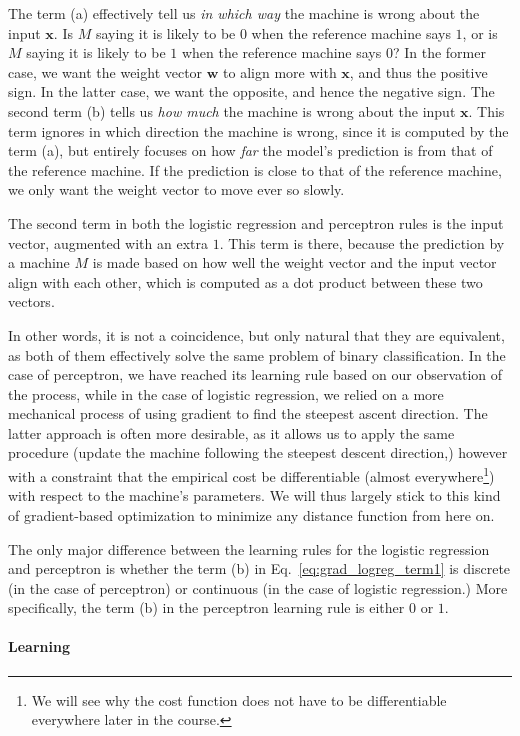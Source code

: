 \documentclass{report}
\newcommand{\vect}[1]{\mathbf{#1}}
\newcommand{\vx}[0]{\vect{x}}
\newcommand{\vw}[0]{\vect{w}}
\newcommand{\todo}[1]{{\Large\textcolor{red}{#1}}}
\begin{document}
The term (a) effectively tell us {\it in which way} the machine is wrong about
the input $\vx$. Is $M$ saying it is likely to be $0$ when the reference machine
says $1$, or is $M$ saying it is likely to be $1$ when the reference machine
says $0$? In the former case, we want the weight vector $\vw$ to align more with
$\vx$, and thus the positive sign. In the latter case, we want the opposite, and
hence the negative sign.  The second term (b) tells us {\it how much} the
machine is wrong about the input $\vx$. This term ignores in which direction the
machine is wrong, since it is computed by the term (a), but entirely focuses on
how {\it far} the model's prediction is from that of the reference machine. If
the prediction is close to that of the reference machine, we only want the
weight vector to move ever so slowly.

The second term in both the logistic regression and perceptron rules is the
input vector, augmented with an extra $1$. This term is there, because the
prediction by a machine $M$ is made based on how well the weight vector and the
input vector align with each other, which is computed as a dot product between
these two vectors. 

In other words, it is not a coincidence, but only natural that they are
equivalent, as both of them effectively solve the same problem of binary
classification. In the case of perceptron, we have reached its learning rule
based on our observation of the process, while in the case of logistic
regression, we relied on a more mechanical process of using gradient to find the
steepest ascent direction. The latter approach is often more desirable, as it
allows us to apply the same procedure (update the machine following the steepest
descent direction,) however with a constraint that the empirical cost be
differentiable (almost everywhere\footnote{
    We will see why the cost function does not have to be differentiable
    everywhere later in the course.
}) with respect to the machine's parameters. We will thus largely stick to this
kind of gradient-based optimization to minimize any distance function from here
on.

The only major difference between the learning rules for the logistic regression
and perceptron is whether the term (b) in Eq.~\eqref{eq:grad_logreg_term1} is
discrete (in the case of perceptron) or continuous (in the case of logistic
regression.) More specifically, the term (b) in the perceptron learning rule is
either $0$ or $1$.  \todo{}

\paragraph{Learning}
\end{document}
